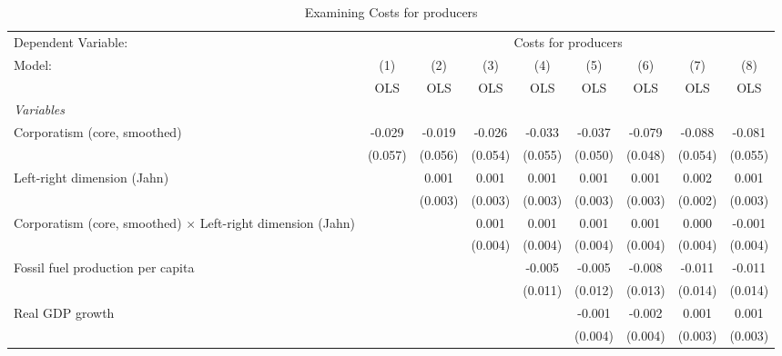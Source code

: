 
\begin{table}[htbp]
   \caption{Examining Costs for producers}
   \centering
   \begin{tabular}{lcccccccc}
      \toprule
      Dependent Variable: & \multicolumn{8}{c}{Costs for producers}\\
      Model:                                                             & (1)     & (2)     & (3)     & (4)     & (5)     & (6)     & (7)     & (8)\\  
                                                                         &  OLS    & OLS     & OLS     & OLS     & OLS     & OLS     & OLS     & OLS\\  
      \midrule
      \emph{Variables}\\
      Corporatism (core, smoothed)                                       & -0.029  & -0.019  & -0.026  & -0.033  & -0.037  & -0.079  & -0.088  & -0.081\\   
                                                                         & (0.057) & (0.056) & (0.054) & (0.055) & (0.050) & (0.048) & (0.054) & (0.055)\\   
      Left-right dimension (Jahn)                                        &         & 0.001   & 0.001   & 0.001   & 0.001   & 0.001   & 0.002   & 0.001\\   
                                                                         &         & (0.003) & (0.003) & (0.003) & (0.003) & (0.003) & (0.002) & (0.003)\\   
      Corporatism (core, smoothed) $\times$ Left-right dimension (Jahn)  &         &         & 0.001   & 0.001   & 0.001   & 0.001   & 0.000   & -0.001\\   
                                                                         &         &         & (0.004) & (0.004) & (0.004) & (0.004) & (0.004) & (0.004)\\   
      Fossil fuel production per capita                                  &         &         &         & -0.005  & -0.005  & -0.008  & -0.011  & -0.011\\   
                                                                         &         &         &         & (0.011) & (0.012) & (0.013) & (0.014) & (0.014)\\   
      Real GDP growth                                                    &         &         &         &         & -0.001  & -0.002  & 0.001   & 0.001\\   
                                                                         &         &         &         &         & (0.004) & (0.004) & (0.003) & (0.003)\\   

\end{tabular}
\end{table}
